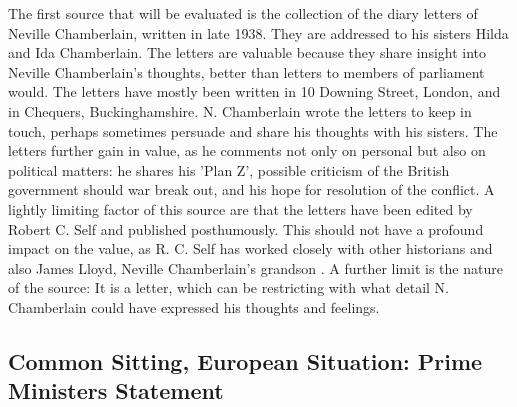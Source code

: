 \documentclass[10pt, a4papert, hidelinks]{article}
\begin{document}

The first source that will be evaluated is the collection of the diary letters of Neville Chamberlain, written in late 1938. They are addressed to his sisters Hilda and Ida Chamberlain. The letters are valuable because they share insight into Neville Chamberlain's thoughts, better than letters to members of parliament would. The letters have mostly been written in 10 Downing Street, London, and in Chequers, Buckinghamshire. N. Chamberlain wrote the letters to keep in touch, perhaps sometimes persuade and share his thoughts with his sisters. The letters further gain in value, as he comments not only on personal but also on political matters: he shares his 'Plan Z', possible criticism of the British government should war break out, and his hope for resolution of the conflict. A lightly limiting factor of this source are that the letters have been edited by Robert C. Self and published posthumously. This should not have a profound impact on the value, as R. C. Self has worked closely with other historians and also James Lloyd, Neville Chamberlain's grandson \cite{chamberlain_neville_2000}. A further limit is the nature of the source: It is a letter, which can be restricting with what detail N. Chamberlain could have expressed his thoughts and feelings.

\subsection{Common Sitting, European Situation: Prime Ministers Statement}

\end{document}
